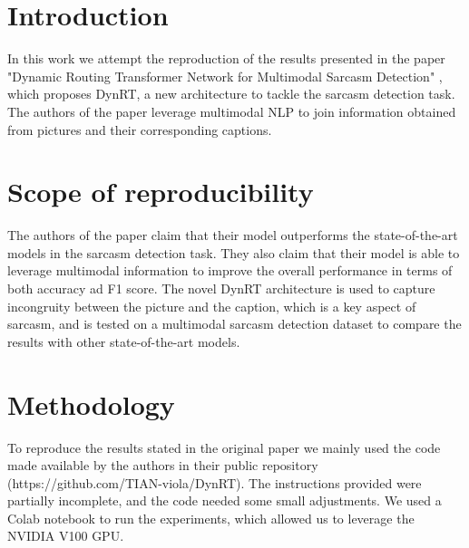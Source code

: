 \section{Introduction}
In this work we attempt the reproduction of the results presented in the paper "Dynamic Routing Transformer Network for Multimodal Sarcasm Detection" \cite{tian-etal-2023-dynamic}, which proposes DynRT, a new architecture to tackle the sarcasm detection task. The authors of the paper leverage multimodal NLP to join information obtained from pictures and their corresponding captions. 

\section{Scope of reproducibility}
\label{sec:claims}

The authors of the paper claim that their model outperforms the state-of-the-art models in the sarcasm detection task. They also claim that their model is able to leverage multimodal information to improve the overall performance in terms of both accuracy ad F1 score.
The novel DynRT architecture is used to capture incongruity between the picture and the caption, which is a key aspect of sarcasm, and is tested on a multimodal sarcasm detection dataset to compare the results with other state-of-the-art models.
 



\section{Methodology}
To reproduce the results stated in the original paper we mainly used the code made available by the authors in their public repository (https://github.com/TIAN-viola/DynRT). The instructions provided were partially incomplete, and the code needed some small adjustments. We used a Colab notebook to run the experiments, which allowed us to leverage the NVIDIA V100 GPU.

